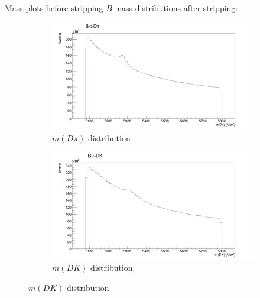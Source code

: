 \documentclass{beamer}
\begin{document}
\begin{frame}{Mass plots before stripping}
  $B$ mass distributions after stripping:
  \begin{figure}
    \centering
    \vspace{-0.2cm}
    \begin{subfigure}{0.5\textwidth}
      \includegraphics[width = 1.0\textwidth]{BMassBeforeCutsB2DPi.png}
      \caption{$m(D\pi)$ distribution}
    \end{subfigure}%
    \begin{subfigure}{0.5\textwidth}
      \includegraphics[width = 1.0\textwidth]{BMassBeforeCutsB2DK.png}
      \caption{$m(DK)$ distribution}
    \end{subfigure}
  \end{figure}
\end{frame}
\end{document}
